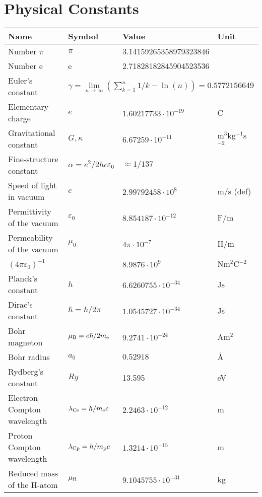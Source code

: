 \chapter*{\center Physical Constants}
\begin{center}
\begin{tabular}{||l|lll||}
\hline
{\bf Name}&{\bf Symbol}&{\bf Value}&{\bf Unit}\\
\hline
\hline
Number $\pi$                 &$\pi$&3.14159265358979323846&\\
Number e                     &e    &2.71828182845904523536&\\
Euler's constant &\multicolumn{3}{|l||}{$\gamma=\lim\limits_{n\rightarrow\infty}\left(\sum\limits_{k=1}^n 1/k-\ln(n)\right)=0.5772156649$}\\
\hline
Elementary charge            &$e$&$1.60217733\cdot10^{-19}$&C\rule{0pt}{13pt}\\
Gravitational constant       &$G,\kappa$&$6.67259\cdot10^{-11}$&m$^3$kg$^{-1}$s$^{-2}$\\
Fine-structure constant      &$\alpha=e^2/2hc\varepsilon_0$&$\approx1/137$&\\
Speed of light in vacuum     &$c$&$2.99792458\cdot10^8$&m/s (def)\\
Permittivity of the vacuum   &$\varepsilon_0$&$8.854187\cdot10^{-12}$&F/m\\
Permeability of the vacuum   &$\mu_0$&$4\pi\cdot10^{-7}$&H/m\\
$(4\pi\varepsilon_0)^{-1}$   &&$8.9876\cdot10^9$&Nm$^2$C$^{-2}$\\
\hline
Planck's constant            &$h$&$6.6260755\cdot10^{-34}$&Js\rule{0pt}{13pt}\\
Dirac's constant             &$\hbar=h/2\pi$&$1.0545727\cdot10^{-34}$&Js\\
Bohr magneton                &$\mu_{\rm B}=e\hbar/2m_{\rm e}$&$9.2741\cdot10^{-24}$&Am$^2$\\
Bohr radius                  &$a_0$&$0.52918$&\AA\\
Rydberg's constant           &$Ry$&13.595&eV\\
Electron Compton wavelength  &$\lambda_{\rm Ce}=h/m_{\rm e} c$&$2.2463\cdot10^{-12}$&m\\
Proton Compton wavelength    &$\lambda_{\rm Cp}=h/m_{\rm p}c$&$1.3214\cdot10^{-15}$&m\\
Reduced mass of the H-atom   &$\mu_{\rm H}$&$9.1045755\cdot10^{-31}$&kg\\

\end{tabular}
\end{center}
